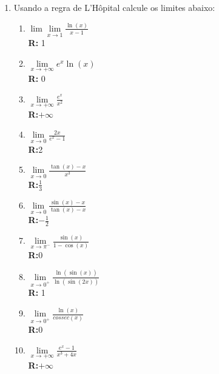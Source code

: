 \documentclass[oneside,a4paper,12pt]{article}
\begin{document}
\begin{enumerate}
	\item Usando a regra de L'Hôpital calcule os limites abaixo:
	\begin{enumerate}
		\item $\lim\lim\limits_{x \rightarrow 1}\frac{\ln(x)}{x-1}$ \\ {\bf R:} 1
		\item $\lim\limits_{x \rightarrow + \infty}e^x\ln(x)$ \\ {\bf R:} 0
		\item $\lim\limits_{x \rightarrow + \infty}\frac{e^x}{x^2}$ \\ {\bf R:}$+ \infty$
		\item $\lim\limits_{x \rightarrow 0}\frac{2x}{e^x - 1}$ \\ {\bf R:}2
		\item $\lim\limits_{x \rightarrow 0}\frac{\tan(x)-x}{x^3}$ \\ {\bf R:}$\frac{1}{3}$
		\item $\lim\limits_{x \rightarrow 0}\frac{\sin(x)-x}{\tan(x)-x}$ \\ {\bf R:}$-\frac{1}{2}$
		\item $\lim\limits_{x \rightarrow \pi^{-}}\frac{\sin(x)}{1-\cos(x)}$ \\ {\bf R:}0
		\item $\lim\limits_{x \rightarrow 0^{+}}\frac{\ln(\sin(x))}{\ln(\sin(2x))}$ \\ {\bf R:} 1
		\item $\lim\limits_{x \rightarrow 0^{+}}\frac{\ln(x)}{cossec(x)}$ \\ {\bf R:}0
		\item $\lim\limits_{x \rightarrow + \infty}\frac{e^x - 1}{x^3 + 4x}$ \\ {\bf R:}$+ \infty$
	\end{enumerate}
	
\end{enumerate}


	
\end{document}
